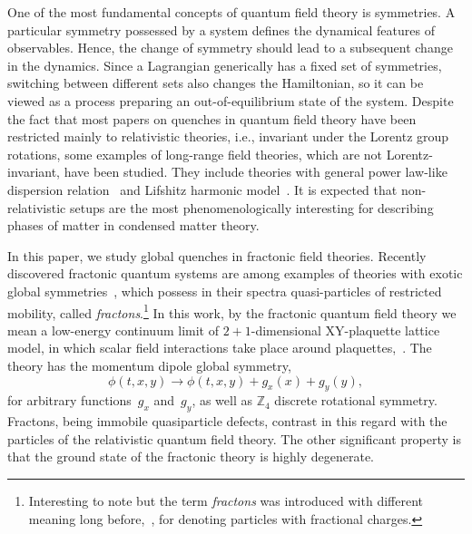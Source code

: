 \documentclass[a4paper,12pt]{article}
\newcommand{\be}{\begin{equation}}
\newcommand{\ee}{\end{equation}}
\newcommand{\nn}{\nonumber}
\newcommand{\Z}[1]{\mathbb{Z}_{#1}}
\begin{document}
One of the most fundamental concepts of quantum field theory is symmetries. A particular symmetry possessed by a system defines the dynamical features of observables. Hence, the change of symmetry should lead to a subsequent change in the dynamics. Since a Lagrangian generically has a fixed set of symmetries, switching between different sets also changes the Hamiltonian, so it can be viewed as a process preparing an out-of-equilibrium state of the system. Despite the fact that most papers on quenches in quantum field theory have been restricted mainly to relativistic theories, i.e., invariant under the Lorentz group rotations, some examples of long-range field theories, which are not Lorentz-invariant, have been studied. They include theories with general power law-like dispersion relation~\cite{Rajabpour:2014osa, Mozaffar:2021nex} and Lifshitz harmonic model~\cite{MohammadiMozaffar:2018vmk, MohammadiMozaffar:2019gpn}. It is expected that non-relativistic setups are the most phenomenologically interesting for describing phases of matter in condensed matter theory.

In this paper, we study global quenches in fractonic field theories. Recently discovered fractonic quantum systems are among examples of theories with exotic global symmetries~\cite{Vijay:2015mka, Pretko:2018jbi, Gromov2019towards, Radzihovsky:2019jdo, Seiberg:2019vrp, Seiberg:2020bhn, Seiberg:2020wsg, Distler:2021bop, Bulmash:2023msp}, which possess in their spectra quasi-particles of restricted mobility, called \emph{fractons}.\footnote{Interesting to note but the term \emph{fractons} was introduced with different meaning long before,~\cite{Khlopov1981fractionally}, for denoting particles with fractional charges.} In this work, by the fractonic quantum field theory we mean a low-energy continuum limit of $2 + 1$-dimensional XY-plaquette lattice model, in which scalar field interactions take place around plaquettes,~\cite{Paramekanti2002ring, Seiberg:2020bhn}. The theory has the momentum dipole global symmetry,
\be\nn
    \phi(t, x, y) \to \phi(t, x, y) + g_x(x) + g_y(y),
\ee
for arbitrary functions~$g_x$ and~$g_y$, as well as $\Z4$ discrete rotational symmetry. Fractons, being immobile quasiparticle defects, contrast in this regard with the particles of the relativistic quantum field theory. The other significant property is that the ground state of the fractonic theory is highly degenerate. 
\end{document}
